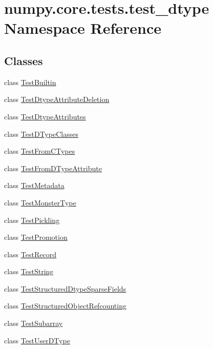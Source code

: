 \hypertarget{namespacenumpy_1_1core_1_1tests_1_1test__dtype}{}\section{numpy.\+core.\+tests.\+test\+\_\+dtype Namespace Reference}
\label{namespacenumpy_1_1core_1_1tests_1_1test__dtype}
\subsection*{Classes}
\begin{DoxyCompactItemize}
\item 
class \hyperlink{classnumpy_1_1core_1_1tests_1_1test__dtype_1_1TestBuiltin}{Test\+Builtin}
\item 
class \hyperlink{classnumpy_1_1core_1_1tests_1_1test__dtype_1_1TestDtypeAttributeDeletion}{Test\+Dtype\+Attribute\+Deletion}
\item 
class \hyperlink{classnumpy_1_1core_1_1tests_1_1test__dtype_1_1TestDtypeAttributes}{Test\+Dtype\+Attributes}
\item 
class \hyperlink{classnumpy_1_1core_1_1tests_1_1test__dtype_1_1TestDTypeClasses}{Test\+D\+Type\+Classes}
\item 
class \hyperlink{classnumpy_1_1core_1_1tests_1_1test__dtype_1_1TestFromCTypes}{Test\+From\+C\+Types}
\item 
class \hyperlink{classnumpy_1_1core_1_1tests_1_1test__dtype_1_1TestFromDTypeAttribute}{Test\+From\+D\+Type\+Attribute}
\item 
class \hyperlink{classnumpy_1_1core_1_1tests_1_1test__dtype_1_1TestMetadata}{Test\+Metadata}
\item 
class \hyperlink{classnumpy_1_1core_1_1tests_1_1test__dtype_1_1TestMonsterType}{Test\+Monster\+Type}
\item 
class \hyperlink{classnumpy_1_1core_1_1tests_1_1test__dtype_1_1TestPickling}{Test\+Pickling}
\item 
class \hyperlink{classnumpy_1_1core_1_1tests_1_1test__dtype_1_1TestPromotion}{Test\+Promotion}
\item 
class \hyperlink{classnumpy_1_1core_1_1tests_1_1test__dtype_1_1TestRecord}{Test\+Record}
\item 
class \hyperlink{classnumpy_1_1core_1_1tests_1_1test__dtype_1_1TestString}{Test\+String}
\item 
class \hyperlink{classnumpy_1_1core_1_1tests_1_1test__dtype_1_1TestStructuredDtypeSparseFields}{Test\+Structured\+Dtype\+Sparse\+Fields}
\item 
class \hyperlink{classnumpy_1_1core_1_1tests_1_1test__dtype_1_1TestStructuredObjectRefcounting}{Test\+Structured\+Object\+Refcounting}
\item 
class \hyperlink{classnumpy_1_1core_1_1tests_1_1test__dtype_1_1TestSubarray}{Test\+Subarray}
\item 
class \hyperlink{classnumpy_1_1core_1_1tests_1_1test__dtype_1_1TestUserDType}{Test\+User\+D\+Type}
\end{DoxyCompactItemize}
